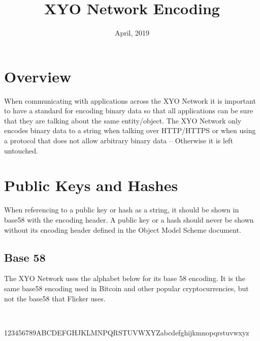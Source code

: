 \documentclass[11pt]{article}
\title{XYO Network Encoding}
\date{April, 2019}
\begin{document}
\maketitle


\section{Overview}
When communicating with applications across the XYO Network it is important to have a standard for encoding binary data so that all applications can be sure that they are talking about the same entity/object. The XYO Network only encodes binary data to a string when talking over HTTP/HTTPS or when using a protocol that does not allow arbitrary binary data -- Otherwise it is left untouched. 


\section{Public Keys and Hashes}
When referencing to a public key or hash as a string, it should be shown in base58 with the encoding header. A public key or a hash should never be shown without its encoding header defined in the Object Model Scheme document. 

\subsection{Base 58}
The XYO Network uses the alphabet below for its base 58 encoding. It is the same base58 encoding used in Bitcoin and other popular cryptocurrencies, but not the base58 that Flicker uses. 

\

\noindent
123456789ABCDEFGHJKLMNPQRSTUVWXYZabcdefghijkmnopqrstuvwxyz
\end{document}
